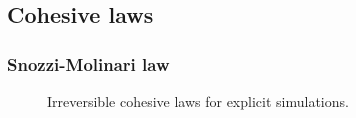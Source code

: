 
\subsection{Cohesive laws}

\subsubsection{Snozzi-Molinari law}

\begin{figure}
  \centering
  \qquad
  \caption{Irreversible cohesive laws for explicit simulations.}
  \label{fig:smm:coh:linear_cohesive_law}
\end{figure}

